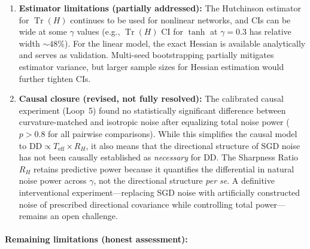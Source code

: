 \documentclass[
  journal=largetwo,
  simfonts=false,
  year=2025,
  volume=37,
]{cup-journal}
\begin{document}
\begin{enumerate}
    \item \textbf{Estimator limitations (partially addressed):} The Hutchinson estimator for $\operatorname{Tr}(H)$ continues to be used for nonlinear networks, and CIs can be wide at some $\gamma$ values (e.g., $\operatorname{Tr}(H)$ CI for $\tanh$ at $\gamma=0.3$ has relative width $\sim 48\%$). For the linear model, the exact Hessian is available analytically and serves as validation. Multi-seed bootstrapping partially mitigates estimator variance, but larger sample sizes for Hessian estimation would further tighten CIs.
    
    \item \textbf{Causal closure (revised, not fully resolved):} The calibrated causal experiment (Loop~5) found no statistically significant difference between curvature-matched and isotropic noise after equalizing total noise power ($p > 0.8$ for all pairwise comparisons). While this simplifies the causal model to $\text{DD} \propto T_{\mathrm{eff}} \times R_H$, it also means that the directional structure of SGD noise has not been causally established as \textit{necessary} for DD. The Sharpness Ratio $R_H$ retains predictive power because it quantifies the differential in natural noise power across $\gamma$, not the directional structure \textit{per se}. A definitive interventional experiment---replacing SGD noise with artificially constructed noise of prescribed directional covariance while controlling total power---remains an open challenge.
\end{enumerate}

\paragraph{Remaining limitations (honest assessment):}
\end{document}
